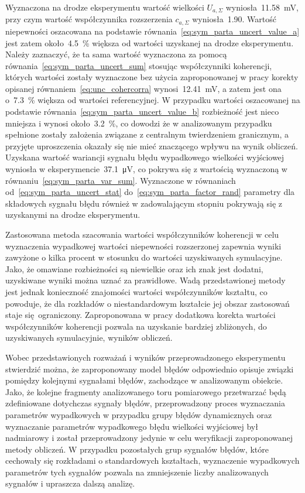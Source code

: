 Wyznaczona na drodze eksperymentu wartość wielkości $U_{a,\Sigma}$ wyniosła~\qty{11.58}{mV}, przy czym wartość współczynnika rozszerzenia $c_{a,\Sigma}$ wyniosła~\num{1.90}. Wartość niepewności oszacowana na podstawie równania~\eqref{eq:sym_parta_uncert_value_a} jest zatem około~\qty{4.5}{\percent} większa od wartości uzyskanej na drodze eksperymentu. Należy zaznaczyć, że ta sama wartość wyznaczona za pomocą równania~\eqref{eq:sym_parta_uncert_sum} stosując współczynniki koherencji, których wartości zostały wyznaczone bez użycia zaproponowanej w pracy korekty opisanej równaniem~\eqref{eq:unc_cohercorra} wynosi~\qty{12.41}{mV}, a zatem jest ona o~\qty{7.3}{\percent} większa od wartości referencyjnej. W przypadku wartości oszacowanej na podstawie równania~\eqref{eq:sym_parta_uncert_value_b} rozbieżność jest nieco mniejsza i wynosi około~\qty{3.2}{\percent}, co dowodzi że w analizowanym przypadku spełnione zostały założenia związane z centralnym twierdzeniem granicznym, a przyjęte uproszczenia okazały się nie mieć znaczącego wpływu na wynik obliczeń. Uzyskana wartość wariancji sygnału błędu wypadkowego wielkości wyjściowej wyniosła w eksperymencie~\qty{37.1}{\micro V}, co pokrywa się z wartością wyznaczoną w równaniu~\eqref{eq:sym_parta_var_sum}. Wyznaczone w równaniach od~\eqref{eq:sym_parta_uncert_stat} do~\eqref{eq:sym_parta_factor_rand} parametry dla składowych sygnału błędu również w zadowalającym stopniu pokrywają się z uzyskanymi na drodze eksperymentu.

Zastosowana metoda szacowania wartości współczynników koherencji w celu wyznaczenia wypadkowej wartości niepewności rozszerzonej zapewnia wyniki zawyżone o kilka procent w stosunku do wartości uzyskiwanych symulacyjne. Jako, że omawiane rozbieżności są niewielkie oraz ich znak jest dodatni, uzyskiwane wyniki można uznać za prawidłowe. Wadą przedstawionej metody jest jednak konieczność znajomości wartości współczynników kształtu, co powoduje, że dla rozkładów o niestandardowym kształcie jej obszar zastosowań staje się ograniczony. Zaproponowana w pracy dodatkowa korekta wartości współczynników koherencji pozwala na uzyskanie bardziej zbliżonych, do uzyskiwanych symulacyjnie, wyników obliczeń.

Wobec przedstawionych rozważań i wyników przeprowadzonego eksperymentu stwierdzić można, że zaproponowany model błędów odpowiednio opisuje związki pomiędzy kolejnymi sygnałami błędów, zachodzące w analizowanym obiekcie. Jako, że kolejne fragmenty analizowanego toru pomiarowego przetwarzać będą zdefiniowane dotychczas sygnały błędów, przeprowadzony proces wyznaczania parametrów wypadkowych w przypadku grupy błędów dynamicznych oraz wyznaczanie parametrów wypadkowego błędu wielkości wyjściowej był nadmiarowy i został przeprowadzony jedynie w celu weryfikacji zaproponowanej metody obliczeń. W przypadku pozostałych grup sygnałów błędów, które cechowały się rozkładami o standardowych kształtach, wyznaczenie wypadkowych parametrów tych sygnałów pozwala na zmniejszenie liczby analizowanych sygnałów i upraszcza dalszą analizę.


